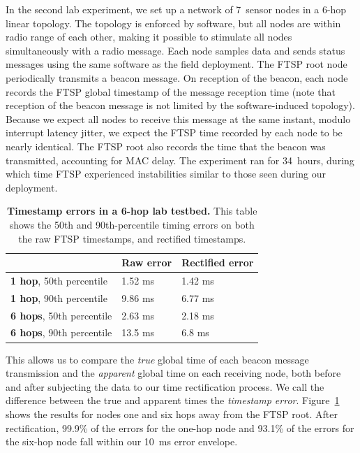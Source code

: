 In the second lab experiment, we set up a network of 7~sensor nodes in a
6-hop linear topology. The topology is enforced by software, but all nodes
are within radio range of each other, making it possible to stimulate all
nodes simultaneously with a radio message. Each node samples data and sends
status messages using the same software as the field deployment. The FTSP
root node periodically transmits a beacon message. On reception of the
beacon, each node records the FTSP global timestamp of the message reception
time (note that reception of the beacon message is not limited by the
software-induced topology). Because we expect all nodes to receive this
message at the same instant, modulo interrupt latency jitter, we expect the
FTSP time recorded by each node to be nearly identical. The FTSP root also
records the time that the beacon was transmitted, accounting for MAC delay.
The experiment ran for 34~hours, during which time FTSP experienced
instabilities similar to those seen during our deployment.

\begin{table}[t]
\begin{center}
\begin{tabular}{|lll|} \hline & \textbf{Raw error} & \textbf{Rectified error} \\ \hline
\textbf{1 hop}, 50th percentile & 1.52 ms & 1.42 ms \\ 
\textbf{1 hop}, 90th percentile & 9.86 ms & 6.77 ms \\ \hline 
\textbf{6 hops}, 50th percentile & 2.63 ms & 2.18 ms \\ 
\textbf{6 hops}, 90th percentile & 13.5 ms & 6.8 ms \\ \hline 
\end{tabular}
\end{center}

\caption{\textbf{Timestamp errors in a 6-hop lab testbed.} This table shows
the 50th and 90th-percentile timing errors on both the raw FTSP timestamps,
and rectified timestamps.}

\label{evaluation-fig-time-rect-lab}
\end{table}

This allows us to compare the \textit{true} global time of each beacon
message transmission and the \textit{apparent} global time on each receiving
node, both before and after subjecting the data to our time rectification
process. We call the difference between the true and apparent times the
\textit{timestamp error}. Figure~\ref{evaluation-fig-time-rect-lab} shows the
results for nodes one and six hops away from the FTSP root. After
rectification, 99.9\% of the errors for the one-hop node and 93.1\% of the
errors for the six-hop node fall within our 10~ms error envelope.

